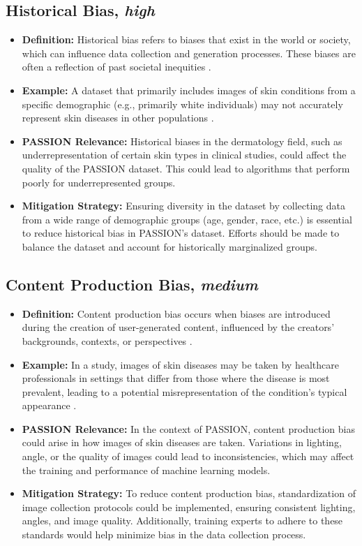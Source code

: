 \begin{refsection}
		\subsection{Historical Bias, \textit{high}}
		\begin{itemize}
			\item \textbf{Definition:} Historical bias refers to biases that exist in the world or society, which can influence data collection and generation processes. These biases are often a reflection of past societal inequities \autocite{M144_Suresh_2021}.
			\item \textbf{Example:} A dataset that primarily includes images of skin conditions from a specific demographic (e.g., primarily white individuals) may not accurately represent skin diseases in other populations \autocite{Mehrabi_2021}.
			\item \textbf{PASSION Relevance:} Historical biases in the dermatology field, such as underrepresentation of certain skin types in clinical studies, could affect the quality of the PASSION dataset. This could lead to algorithms that perform poorly for underrepresented groups.
			\item \textbf{Mitigation Strategy:} Ensuring diversity in the dataset by collecting data from a wide range of demographic groups (age, gender, race, etc.) is essential to reduce historical bias in PASSION's dataset. Efforts should be made to balance the dataset and account for historically marginalized groups.
		\end{itemize}
		
		\subsection{Content Production Bias, \textit{medium}}
		\begin{itemize}
			\item \textbf{Definition:} Content production bias occurs when biases are introduced during the creation of user-generated content, influenced by the creators' backgrounds, contexts, or perspectives \autocite{M120_Olteanu_2019}.
			\item \textbf{Example:} In a study, images of skin diseases may be taken by healthcare professionals in settings that differ from those where the disease is most prevalent, leading to a potential misrepresentation of the condition's typical appearance \autocite{M120_Olteanu_2019}.
			\item \textbf{PASSION Relevance:} In the context of PASSION, content production bias could arise in how images of skin diseases are taken. Variations in lighting, angle, or the quality of images could lead to inconsistencies, which may affect the training and performance of machine learning models.
			\item \textbf{Mitigation Strategy:} To reduce content production bias, standardization of image collection protocols could be implemented, ensuring consistent lighting, angles, and image quality. Additionally, training experts to adhere to these standards would help minimize bias in the data collection process.
		\end{itemize}
		

\end{refsection}
